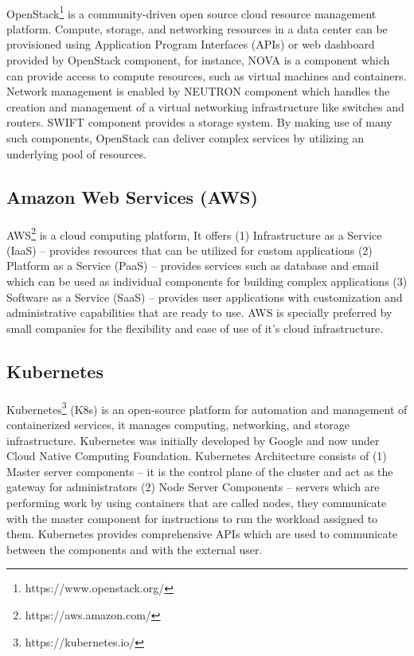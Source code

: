 \paragraph{}
OpenStack\footnote{https://www.openstack.org/} is a community-driven open source cloud resource management platform. Compute, storage, and networking resources in a data center can be provisioned using Application Program Interfaces (APIs) or web dashboard provided by OpenStack component, for instance, NOVA is a component which can provide access to compute resources, such as virtual machines and containers. Network management is enabled by NEUTRON component which handles the creation and management of a virtual networking infrastructure like switches and routers. SWIFT component provides a storage system. By making use of many such components, OpenStack can deliver complex services by utilizing an underlying pool of resources.
\subsection{Amazon Web Services (AWS)}
\paragraph{}
AWS\footnote{https://aws.amazon.com/} is a cloud computing platform, It offers (1) Infrastructure as a Service (IaaS) -- provides resources that can be utilized for custom applications (2) Platform as a Service (PaaS) -- provides services such as database and email which can be used as individual components for building complex applications (3) Software as a Service (SaaS) -- provides user applications with customization and administrative capabilities that are ready to use. AWS is specially preferred by small companies for the flexibility and ease of use of it's cloud infrastructure.
\subsection{Kubernetes}
\label{SecKubernetes}
\paragraph{}
Kubernetes\footnote{https://kubernetes.io/} (K8s) is an open-source platform for automation and management of containerized services, it manages computing, networking, and storage infrastructure. Kubernetes was initially developed by Google and now under Cloud Native Computing Foundation. Kubernetes Architecture consists of (1) Master server components -- it is the control plane of the cluster and act as the gateway for  administrators (2) Node Server Components -- servers which are performing work by using containers that are called nodes, they communicate with the master component for instructions to run the workload assigned to them. Kubernetes provides comprehensive APIs which are used to communicate between the components and with the external user.
